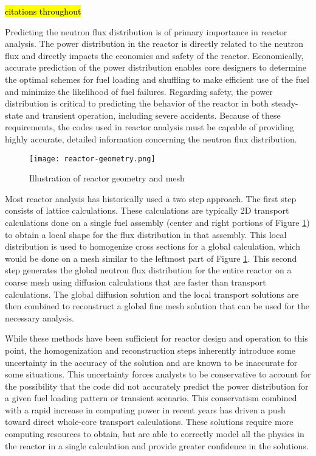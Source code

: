 \hl{citations throughout}

Predicting the neutron flux distribution is of primary importance in reactor analysis.  The power distribution in the reactor is directly related to the neutron flux and directly impacts the economics and safety of the reactor.  Economically, accurate prediction of the power distribution enables core designers to determine the optimal schemes for fuel loading and shuffling to make efficient use of the fuel and minimize the likelihood of fuel failures.  Regarding safety, the power distribution is critical to predicting the behavior of the reactor in both steady-state and transient operation, including severe accidents.  Because of these requirements, the codes used in reactor analysis must be capable of providing highly accurate, detailed information concerning the neutron flux distribution.

\begin{figure}[h]
    \centering
    \texttt{[image: reactor-geometry.png]}
    \caption{Illustration of reactor geometry and mesh}\label{f:reactor-geometry}
\end{figure}

Most reactor analysis has historically used a two step approach.  The first step consists of lattice calculations.  These calculations are typically 2D transport calculations done on a single fuel assembly (center and right portions of Figure \ref{f:reactor-geometry}) to obtain a local shape for the flux distribution in that assembly.  This local distribution is used to homogenize cross sections for a global calculation, which would be done on a mesh similar to the leftmost part of Figure \ref{f:reactor-geometry}.  This second step generates the global neutron flux distribution for the entire reactor on a coarse mesh using diffusion calculations that are faster than transport calculations.  The global diffusion solution and the local transport solutions are then combined to reconstruct a global fine mesh solution that can be used for the necessary analysis.

While these methods have been sufficient for reactor design and operation to this point, the homogenization and reconstruction steps inherently introduce some uncertainty in the accuracy of the solution and are known to be inaccurate for some situations.  This uncertainty forces analysts to be conservative to account for the possibility that the code did not accurately predict the power distribution for a given fuel loading pattern or transient scenario.  This conservatism combined with a rapid increase in computing power in recent years has driven a push toward direct whole-core transport calculations.  These solutions require more computing resources to obtain, but are able to correctly model all the physics in the reactor in a single calculation and provide greater confidence in the solutions.


